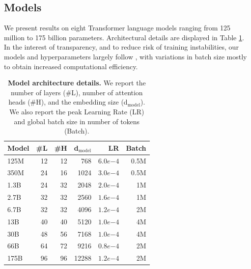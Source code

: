 \subsection{Models}
\label{sec:models}

We present results on eight Transformer language models ranging from 125 million to 175 billion parameters. Architectural details are displayed in Table \ref{tab:model_sizes}. In the interest of transparency, and to reduce risk of training instabilities, our models and hyperparameters largely follow \citet{brown2020gpt3}, with variations in batch size mostly to obtain increased computational efficiency.

\begin{table}[t]
    \centering
    \begin{tabular}{lrrrrr}
    \toprule
    {\bf Model} & {\bf \#L} & {\bf \#H}  & {\bf d$_{\text{model}}$} & {\bf LR} & {\bf Batch} \\
    \midrule
        125M    & 12 & 12 & 768   & $6.0e{-4}$ & 0.5M \\
        350M    & 24 & 16 & 1024  & $3.0e{-4}$ & 0.5M \\
        1.3B    & 24 & 32 & 2048  & $2.0e{-4}$ & 1M \\
        2.7B    & 32 & 32 & 2560  & $1.6e{-4}$ & 1M \\
        6.7B    & 32 & 32 & 4096  & $1.2e{-4}$ & 2M \\
        13B     & 40 & 40 & 5120  & $1.0e{-4}$ & 4M \\
        30B     & 48 & 56 & 7168  & $1.0e{-4}$ & 4M \\
        66B     & 64 & 72 & 9216  & $0.8e{-4}$ & 2M \\
        175B    & 96 & 96 & 12288 & $1.2e{-4}$ & 2M\\
    \bottomrule
    \end{tabular}
    \caption{{\bf Model architecture details.} We report the number of layers (\#L),
    number of attention heads (\#H), and the embedding size ({d$_{\text{model}}$}).
    We also report the peak Learning Rate (LR) and global batch size in number of tokens (Batch).
    }
    \label{tab:model_sizes}
\end{table}